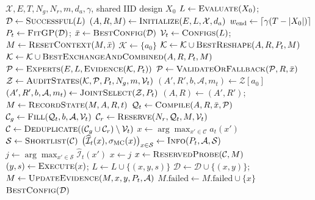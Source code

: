 \documentclass[runningheads]{llncs}
\begin{document}
\begin{algorithm}[htbp]
\caption{JointTune: joint search-state revision}
\label{alg:JointTune}
\begin{algorithmic}[1]
\Require $\mathcal X,E,T,N_g,N_r,m,d_a,\gamma$, shared IID design $X_0$
\State $L\gets\textsc{Evaluate}(X_0)$; $\mathcal D\gets\textsc{Successful}(L)$
\State $(A,R,M)\gets\textsc{Initialize}(E,L,\mathcal X,d_a)$
\State $w_{\rm end}\gets\lceil\gamma(T-|X_0|)\rceil$
 \State $P_t\gets\textsc{FitGP}(\mathcal D)$; $\bar x\gets\textsc{BestConfig}(\mathcal D)$
 \State $\mathcal V_t\gets\textsc{Configs}(L)$; $M\gets\textsc{ResetContext}(M,\bar x)$
 \State $\mathcal K\gets\{a_0\}$
  \State $\mathcal K\gets\mathcal K\cup\textsc{BestReshape}(A,R,P_t,M)$
   \State $\mathcal K\gets\mathcal K\cup\textsc{BestExchangeAndCombined}(A,R,P_t,M)$
  \EndIf
 \EndIf
 \State $\mathcal P\gets\textsc{Experts}(E,L,\textsc{Evidence}(\mathcal K,P_t))$
 \State $\mathcal P\gets\textsc{ValidateOrFallback}(\mathcal P,R,\bar x)$
 \State $\mathcal Z\gets\textsc{AuditStates}(\mathcal K,\mathcal P,P_t,N_g,m,\mathcal V_t)$
 \State $(A',R',b,\mathcal A,m_t)\gets\mathcal Z[a_0]$
  \State $(A',R',b,\mathcal A,m_t)\gets\textsc{JointSelect}(\mathcal Z,P_t)$
 \EndIf
 \State $(A,R)\gets(A',R')$; $M\gets\textsc{RecordState}(M,A,R,t)$
 \State $\mathcal Q_t\gets\textsc{Compile}(A,R,\bar x,\mathcal P)$
 \State $\mathcal C_g\gets\textsc{Fill}(\mathcal Q_t,b,\mathcal A,\mathcal V_t)$
 \State $\mathcal C_r\gets\textsc{Reserve}(N_r,\mathcal Q_t,M,\mathcal V_t)$
 \State $\mathcal C\gets\textsc{Deduplicate}((\mathcal C_g\cup\mathcal C_r)\setminus\mathcal V_t)$
 \State $x\gets\arg\max_{x'\in\mathcal C}a_t(x')$
  \State $\mathcal S\gets\textsc{Shortlist}(\mathcal C)$
  \State $\bigl(\widehat{\mathcal I}_t(x),\sigma_{\rm MC}(x)\bigr)_{x\in\mathcal S}\gets\textsc{Info}(P_t,\mathcal A,\mathcal S)$
  \State $j\gets\arg\max_{x'\in\mathcal S}\widehat{\mathcal I}_t(x')$
   \State $x\gets j$ \EndIf
 \EndIf
  \State $x\gets\textsc{ReservedProbe}(\mathcal C,M)$
 \EndIf
 \State $(y,s)\gets\textsc{Execute}(x)$; $L\gets L\cup\{(x,y,s)\}$
  \State $\mathcal D\gets\mathcal D\cup\{(x,y)\}$; $M\gets\textsc{UpdateEvidence}(M,x,y,P_t,\mathcal A)$
 \Else
  \State $M.\mathrm{failed}\gets M.\mathrm{failed}\cup\{x\}$
 \EndIf
\EndFor
\State \Return $\textsc{BestConfig}(\mathcal D)$
\end{algorithmic}
\end{algorithm}
\end{document}
